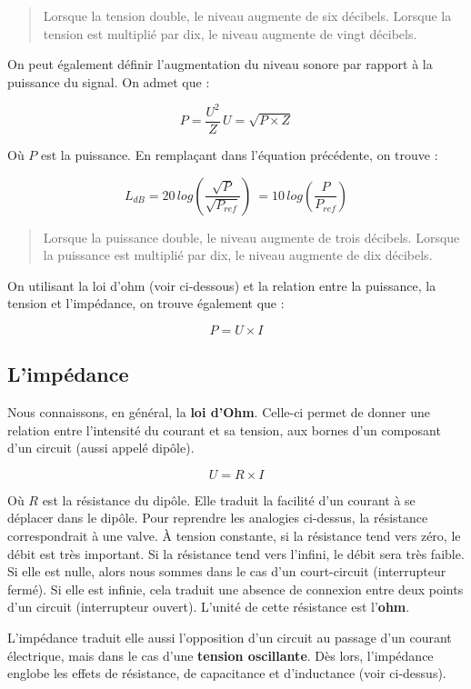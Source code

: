 \documentclass[
  letterpaper,
  DIV=11,
  numbers=noendperiod]{scrreprt}
\begin{document}
\begin{quote}
Lorsque la tension double, le niveau augmente de six décibels. Lorsque
la tension est multiplié par dix, le niveau augmente de vingt décibels.
\end{quote}

On peut également définir l'augmentation du niveau sonore par rapport à
la puissance du signal. On admet que :

\[ P = \frac{U^2}{Z} \, U = \sqrt{P \times Z} \]

Où \(P\) est la puissance. En remplaçant dans l'équation précédente, on
trouve :

\[ L_{dB} = 20 \, log (\frac{\sqrt{P}}{\sqrt{P_{ref}}}) \> = 10 \, log (\frac{P}{P_{ref}}) \]

\begin{quote}
Lorsque la puissance double, le niveau augmente de trois décibels.
Lorsque la puissance est multiplié par dix, le niveau augmente de dix
décibels.
\end{quote}

On utilisant la loi d'ohm (voir ci-dessous) et la relation entre la
puissance, la tension et l'impédance, on trouve également que :

\[ P = U \times I \]

\hypertarget{limpuxe9dance}{%
\subsection{L'impédance}\label{limpuxe9dance}}

Nous connaissons, en général, la \textbf{loi d'Ohm}. Celle-ci permet de
donner une relation entre l'intensité du courant et sa tension, aux
bornes d'un composant d'un circuit (aussi appelé dipôle).

\[ U = R \times I \]

Où \(R\) est la résistance du dipôle. Elle traduit la facilité d'un
courant à se déplacer dans le dipôle. Pour reprendre les analogies
ci-dessus, la résistance correspondrait à une valve. À tension
constante, si la résistance tend vers zéro, le débit est très important.
Si la résistance tend vers l'infini, le débit sera très faible. Si elle
est nulle, alors nous sommes dans le cas d'un court-circuit
(interrupteur fermé). Si elle est infinie, cela traduit une absence de
connexion entre deux points d'un circuit (interrupteur ouvert). L'unité
de cette résistance est l'\textbf{ohm}.

L'impédance traduit elle aussi l'opposition d'un circuit au passage d'un
courant électrique, mais dans le cas d'une \textbf{tension oscillante}.
Dès lors, l'impédance englobe les effets de résistance, de capacitance
et d'inductance (voir ci-dessus).
\end{document}
